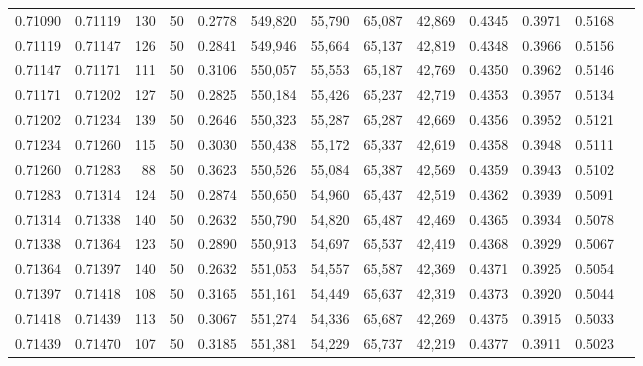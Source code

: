 \begin{tabular}{rrrrrrrrrrrrr}
0.71090 & 0.71119 &   130 &  50 &                                     0.2778 & 549,820 &  55,790 &  65,087 &  42,869 & 0.4345 & 0.3971 & 0.5168 \\
0.71119 & 0.71147 &   126 &  50 &                                     0.2841 & 549,946 &  55,664 &  65,137 &  42,819 & 0.4348 & 0.3966 & 0.5156 \\
0.71147 & 0.71171 &   111 &  50 &                                     0.3106 & 550,057 &  55,553 &  65,187 &  42,769 & 0.4350 & 0.3962 & 0.5146 \\
0.71171 & 0.71202 &   127 &  50 &                                     0.2825 & 550,184 &  55,426 &  65,237 &  42,719 & 0.4353 & 0.3957 & 0.5134 \\
0.71202 & 0.71234 &   139 &  50 &                                     0.2646 & 550,323 &  55,287 &  65,287 &  42,669 & 0.4356 & 0.3952 & 0.5121 \\
0.71234 & 0.71260 &   115 &  50 &                                     0.3030 & 550,438 &  55,172 &  65,337 &  42,619 & 0.4358 & 0.3948 & 0.5111 \\
0.71260 & 0.71283 &    88 &  50 &                                     0.3623 & 550,526 &  55,084 &  65,387 &  42,569 & 0.4359 & 0.3943 & 0.5102 \\
0.71283 & 0.71314 &   124 &  50 &                                     0.2874 & 550,650 &  54,960 &  65,437 &  42,519 & 0.4362 & 0.3939 & 0.5091 \\
0.71314 & 0.71338 &   140 &  50 &                                     0.2632 & 550,790 &  54,820 &  65,487 &  42,469 & 0.4365 & 0.3934 & 0.5078 \\
0.71338 & 0.71364 &   123 &  50 &                                     0.2890 & 550,913 &  54,697 &  65,537 &  42,419 & 0.4368 & 0.3929 & 0.5067 \\
0.71364 & 0.71397 &   140 &  50 &                                     0.2632 & 551,053 &  54,557 &  65,587 &  42,369 & 0.4371 & 0.3925 & 0.5054 \\
0.71397 & 0.71418 &   108 &  50 &                                     0.3165 & 551,161 &  54,449 &  65,637 &  42,319 & 0.4373 & 0.3920 & 0.5044 \\
0.71418 & 0.71439 &   113 &  50 &                                     0.3067 & 551,274 &  54,336 &  65,687 &  42,269 & 0.4375 & 0.3915 & 0.5033 \\
0.71439 & 0.71470 &   107 &  50 &                                     0.3185 & 551,381 &  54,229 &  65,737 &  42,219 & 0.4377 & 0.3911 & 0.5023 \\

\end{tabular}
